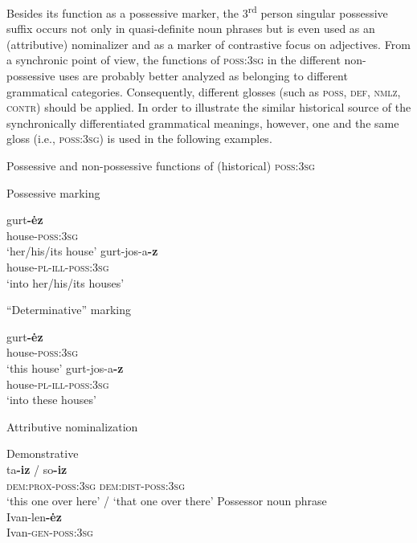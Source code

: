 Besides its function as a possessive marker, the 3\textsuperscript{rd} person singular possessive suffix occurs not only in quasi-definite noun phrases but is even used as an (attributive) nominalizer and as a marker of contrastive focus on adjectives. From a synchronic point of view, the functions of \textsc{poss:3sg} in the different non-possessive uses are probably better analyzed as belonging to different grammatical categories. Consequently, different glosses (such as \textsc{poss, def, nmlz, contr}) should be applied. In order to illustrate the similar historical source of the synchronically differentiated grammatical meanings, however, one and the same gloss (i.e., \textsc{poss:3sg}) is used in the following examples.
\begin{exe}
\ex \rm{Possessive and non-possessive functions of (historical) \textsc{poss:3sg}}
\begin{xlist}
\ex \rm{Possessive marking} \label{udmurt possmarking}
\begin{xlist}
\ex	
\gll	gurt\textbf{-ėz}\\
	house-\textsc{poss:3sg}\\
\glt	‘her/his/its house’
\ex	
\gll	gurt-jos-a\textbf{-z}\\
	house-\textsc{pl}-\textsc{ill}-\textsc{poss:3sg}\\
\glt	‘into her/his/its houses’
\end{xlist}
\ex \rm{“Determinative” marking}
\begin{xlist}
\ex	
\gll	gurt\textbf{-ėz}\\
	house-\textsc{poss:3sg}\\
\glt	‘this house’
\ex	
\gll	gurt-jos-a\textbf{-z}\\
	house-\textsc{pl}-\textsc{ill}-\textsc{poss:3sg}\\
\glt	‘into these houses’
\end{xlist}
\ex	\rm{Attributive nominalization} \label{udmurt diachr nomzr}
\begin{xlist}
\ex \rm{Demonstrative}\\ \label{udmurt diachr dem-nomzr}
\gll	ta\textbf{-iz} / so\textbf{-iz}\\
 	\textsc{dem:prox}-\textsc{poss:3sg} {} \textsc{dem:dist}-\textsc{poss:3sg}\\
\glt	‘this one over here’ / ‘that one over there’
\ex 	\rm{Possessor noun phrase}\\ \label{udmurt diachr gen-nomzr}
\gll	Ivan-len\textbf{-ėz}\\
	Ivan-\textsc{gen}-\textsc{poss:3sg}\\

\end{xlist}
\end{xlist}
\end{exe}
